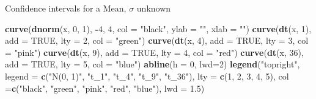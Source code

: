 \documentclass[
  ignorenonframetext,
]{beamer}
\newenvironment{Shaded}{\begin{snugshade}}{\end{snugshade}}
\newcommand{\AttributeTok}[1]{\textcolor[rgb]{0.13,0.29,0.53}{#1}}
\newcommand{\ConstantTok}[1]{\textcolor[rgb]{0.56,0.35,0.01}{#1}}
\newcommand{\DecValTok}[1]{\textcolor[rgb]{0.00,0.00,0.81}{#1}}
\newcommand{\FloatTok}[1]{\textcolor[rgb]{0.00,0.00,0.81}{#1}}
\newcommand{\FunctionTok}[1]{\textcolor[rgb]{0.13,0.29,0.53}{\textbf{#1}}}
\newcommand{\NormalTok}[1]{#1}
\newcommand{\SpecialCharTok}[1]{\textcolor[rgb]{0.81,0.36,0.00}{\textbf{#1}}}
\newcommand{\StringTok}[1]{\textcolor[rgb]{0.31,0.60,0.02}{#1}}
\begin{document}
\begin{frame}[fragile]{Confidence intervals for a Mean, \(\sigma\)
unknown}
\protect\hypertarget{confidence-intervals-for-a-mean-sigma-unknown-4}{}
\tiny

\begin{Shaded}
\begin{Highlighting}[]
\FunctionTok{curve}\NormalTok{(}\FunctionTok{dnorm}\NormalTok{(x, }\DecValTok{0}\NormalTok{, }\DecValTok{1}\NormalTok{), }\SpecialCharTok{{-}}\DecValTok{4}\NormalTok{, }\DecValTok{4}\NormalTok{, }\AttributeTok{col =} \StringTok{"black"}\NormalTok{, }\AttributeTok{ylab =} \StringTok{""}\NormalTok{, }\AttributeTok{xlab =} \StringTok{""}\NormalTok{)}
\FunctionTok{curve}\NormalTok{(}\FunctionTok{dt}\NormalTok{(x, }\DecValTok{1}\NormalTok{), }\AttributeTok{add =} \ConstantTok{TRUE}\NormalTok{, }\AttributeTok{lty =} \DecValTok{2}\NormalTok{, }\AttributeTok{col =} \StringTok{"green"}\NormalTok{)}
\FunctionTok{curve}\NormalTok{(}\FunctionTok{dt}\NormalTok{(x, }\DecValTok{4}\NormalTok{), }\AttributeTok{add =} \ConstantTok{TRUE}\NormalTok{, }\AttributeTok{lty =} \DecValTok{3}\NormalTok{, }\AttributeTok{col =} \StringTok{"pink"}\NormalTok{)}
\FunctionTok{curve}\NormalTok{(}\FunctionTok{dt}\NormalTok{(x, }\DecValTok{9}\NormalTok{), }\AttributeTok{add =} \ConstantTok{TRUE}\NormalTok{, }\AttributeTok{lty =} \DecValTok{4}\NormalTok{, }\AttributeTok{col =} \StringTok{"red"}\NormalTok{)}
\FunctionTok{curve}\NormalTok{(}\FunctionTok{dt}\NormalTok{(x, }\DecValTok{36}\NormalTok{), }\AttributeTok{add =} \ConstantTok{TRUE}\NormalTok{, }\AttributeTok{lty =} \DecValTok{5}\NormalTok{, }\AttributeTok{col =} \StringTok{"blue"}\NormalTok{)}
\FunctionTok{abline}\NormalTok{(}\AttributeTok{h =} \DecValTok{0}\NormalTok{, }\AttributeTok{lwd=}\DecValTok{2}\NormalTok{)}
\FunctionTok{legend}\NormalTok{(}\StringTok{"topright"}\NormalTok{, }\AttributeTok{legend =} \FunctionTok{c}\NormalTok{(}\StringTok{"N(0, 1)"}\NormalTok{, }\StringTok{"t\_1"}\NormalTok{, }\StringTok{"t\_4"}\NormalTok{, }\StringTok{"t\_9"}\NormalTok{, }\StringTok{"t\_36"}\NormalTok{), }
       \AttributeTok{lty =} \FunctionTok{c}\NormalTok{(}\DecValTok{1}\NormalTok{, }\DecValTok{2}\NormalTok{, }\DecValTok{3}\NormalTok{, }\DecValTok{4}\NormalTok{, }\DecValTok{5}\NormalTok{), }\AttributeTok{col =}\FunctionTok{c}\NormalTok{(}\StringTok{"black"}\NormalTok{, }\StringTok{"green"}\NormalTok{, }\StringTok{"pink"}\NormalTok{, }\StringTok{"red"}\NormalTok{, }\StringTok{"blue"}\NormalTok{), }
       \AttributeTok{lwd =} \FloatTok{1.5}\NormalTok{)}
\end{Highlighting}
\end{Shaded}


\end{frame}
\end{document}
